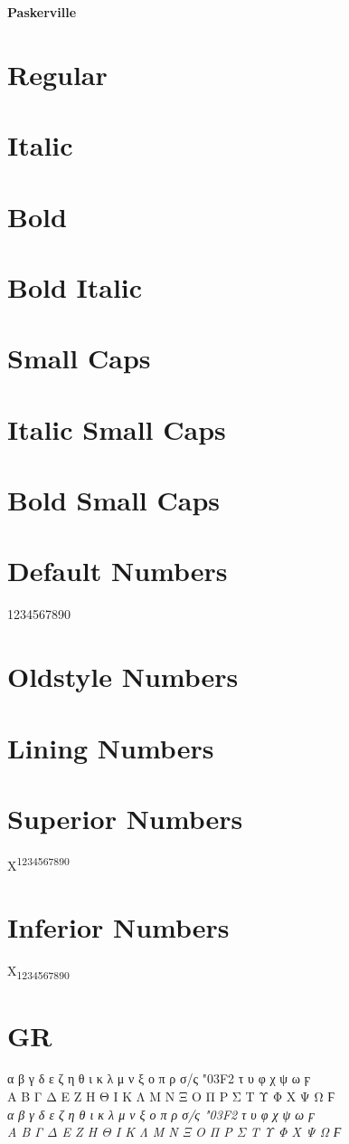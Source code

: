 \documentclass[a4paper,11pt]{article}
\begin{document}
\thispagestyle{empty}

\begin{center}\huge\textbf{Paskerville}
\end{center}
%
\section*{Regular}
\lipsum[1]
%
\section*{Italic}
\emph{\lipsum[2]}
%
\section*{Bold}
\textbf{\lipsum[1]}
%
\section*{Bold Italic}
\textbf{\emph{\lipsum[2]}}
%
\section*{Small Caps}
\textsc{\lipsum[1]}
%
\section*{Italic Small Caps}
\emph{\textsc{\lipsum[2]}}
%
\section*{Bold Small Caps}
\textsc{\textbf{\lipsum[1]}}
%
\section*{Default Numbers}
1234567890
%
\section*{Oldstyle Numbers}
%
\section*{Lining Numbers}
%
\section*{Superior Numbers}
X\textsuperscript{1234567890}
%
\section*{Inferior Numbers}
X\textsubscript{1234567890}
%
\section*{GR}
 α β γ δ ε ζ η θ ι κ λ μ ν ξ ο π ρ σ/ς {\char"03F2} τ υ φ χ ψ ω ϝ \\
 Α Β Γ Δ Ε Ζ Η Θ Ι Κ Λ Μ Ν Ξ Ο Π Ρ Σ Τ Υ Φ Χ Ψ Ω Ϝ\\
 \emph{α β γ δ ε ζ η θ ι κ λ μ ν ξ ο π ρ σ/ς {\char"03F2} τ υ φ χ ψ ω ϝ \\
 Α Β Γ Δ Ε Ζ Η Θ Ι Κ Λ Μ Ν Ξ Ο Π Ρ Σ Τ Υ Φ Χ Ψ Ω Ϝ}\par
%
\end{document}

